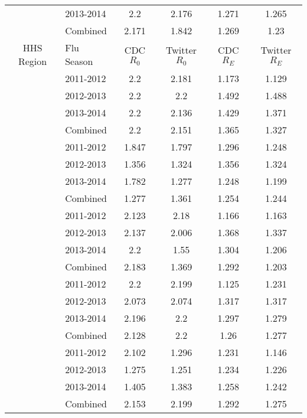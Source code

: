 \begin{longtable}{|c|l|c|c|c|c|}
  & 2013-2014 & 2.2  &  2.176 &   1.271  &   1.265  \\ \cline{2-6}
  & Combined  & 2.171  &  1.842 &   1.269  &   1.23  \\ \cline{1-6}\pagebreak \hline
HHS Region & Flu Season & CDC \(R_0\) & Twitter \(R_0\) & CDC \(R_E\) & Twitter \(R_E\) \\ \hline
 {\multirow{4}{*}{ 6 }} & 2011-2012 & 2.2  &  2.181 &   1.173  &   1.129  \\ \cline{2-6}
  & 2012-2013  & 2.2  &  2.2 &   1.492  &   1.488  \\ \cline{2-6}
  & 2013-2014 & 2.2  &  2.136 &   1.429  &   1.371  \\ \cline{2-6}
  & Combined  & 2.2  &  2.151 &   1.365  &   1.327  \\ \cline{1-6}
 {\multirow{4}{*}{ 7 }} & 2011-2012 & 1.847  &  1.797 &   1.296  &   1.248  \\ \cline{2-6}
  & 2012-2013  & 1.356  &  1.324 &   1.356  &   1.324  \\ \cline{2-6}
  & 2013-2014 & 1.782  &  1.277 &   1.248  &   1.199  \\ \cline{2-6}
  & Combined  & 1.277  &  1.361 &   1.254  &   1.244  \\ \cline{1-6}
 {\multirow{4}{*}{ 8 }} & 2011-2012 & 2.123  &  2.18 &   1.166  &   1.163  \\ \cline{2-6}
  & 2012-2013  & 2.137  &  2.006 &   1.368  &   1.337  \\ \cline{2-6}
  & 2013-2014 & 2.2  &  1.55 &   1.304  &   1.206  \\ \cline{2-6}
  & Combined  & 2.183  &  1.369 &   1.292  &   1.203  \\ \cline{1-6}
 {\multirow{4}{*}{ 9 }} & 2011-2012 & 2.2  &  2.199 &   1.125  &   1.231  \\ \cline{2-6}
  & 2012-2013  & 2.073  &  2.074 &   1.317  &   1.317  \\ \cline{2-6}
  & 2013-2014 & 2.196  &  2.2 &   1.297  &   1.279  \\ \cline{2-6}
  & Combined  & 2.128  &  2.2 &   1.26  &   1.277  \\ \cline{1-6}
 {\multirow{4}{*}{ 10 }} & 2011-2012 & 2.102  &  1.296 &   1.231  &   1.146  \\ \cline{2-6}
  & 2012-2013  & 1.275  &  1.251 &   1.234  &   1.226  \\ \cline{2-6}
  & 2013-2014 & 1.405  &  1.383 &   1.258  &   1.242  \\ \cline{2-6}
  & Combined  & 2.153  &  2.199 &   1.292  &   1.275  \\ \cline{1-6}

\end{longtable}
